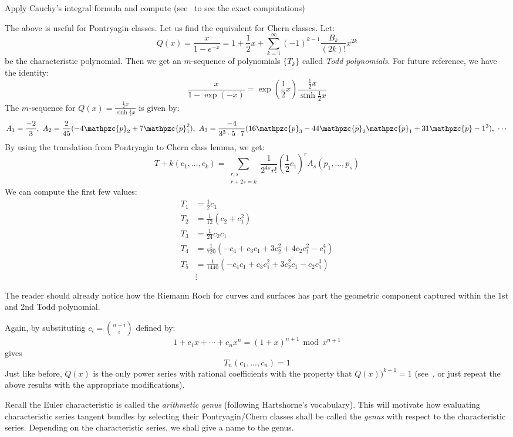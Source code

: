 \documentclass{book}
\newenvironment{Proof}[1][]
  {\begin{ProofTcb}[#1]}
  {\end{ProofTcb}}
\newcommand{\cp}{{\mathpzc{p}}}
\renewcommand{\mod}{\,\operatorname{mod}\,}
\begin{document}
\begin{Proof}
  Apply Cauchy's integral formula and compute (see~\cite[p.12]{hirzebruchTopologicalMethodsAlgebraic1995} to
  see the exact computations)
\end{Proof}

The above is useful for Pontryagin classes. Let us find the equivalent for Chern classes. Let:
\[
  Q(x) = \frac{x}{1-e^{-x}} = 1 + \frac{1}{2}x + \sum_{k=1}^\infty (-1)^{k-1} \frac{B_k}{(2k)!}x^{2k}
\]
be the characteristic polynomial. Then we get an $m$-sequence of polynomials $\{T_k\}$ called \emph{Todd
polynomials}. For future reference, we have the identity:
\[
  \frac{x}{1-\exp(-x)} = \exp \left(\frac{1}{2}x\right) \frac{\frac{1}{2}x}{\sinh \frac{1}{2}x}
\]
The $m$-sequence for $Q(x) = \frac{\frac{1}{2}x}{\sinh \frac{1}{2}x}$ is given by:
\[
  A_1 = \frac{-2}{3},\ A_2 = \frac{2}{45}(-4\cp_2+7\cp_1^2),\  A_3 = \frac{-4}{3^3\cdot 5\cdot 7}(16\cp_3
  -44\cp_2\cp_1 + 31\cp-1^3),\ \cdots
\]
By using the translation from Pontryagin to Chern class lemma, we get:
\[
  T+k(c_1, ..., c_k) = \sum_{\substack{r,s\\r+2s=k}} \frac{1}{2^{4s}r!} \left(\frac{1}{2}c_1\right)^r A_s(p_1, ..., p_s)
\]
We can compute the first few values:
\begin{align*}
  T_1 &= \frac{1}{2}c_1\\
  T_2 &= \frac{1}{12} (c_2 + c_1^2)\\
  T_3 &= \frac{1}{24} c_2c_1\\
  T_4 &= \frac{1}{720} (-c_4 + c_3c_1 + 3c_2^2 + 4c_2c_1^2 - c_1^4)\\
  T_5 &= \frac{1}{1440} \left(-c_4c_1 + c_3c_1^2  +3c_2^2c_1 - c_2c_1^3\right) \\
      &\vdots
\end{align*}

The reader should already notice how the Riemann Roch for curves and surfaces has part the geometric
component captured within the 1st and 2nd Todd polynomial.

Again, by substituting $c_i = \binom{n+i}{i}$ defined by:
\[
  1 + c_1x + \cdots + c_nx^n = (1+x)^{n+1} \mod x^{n+1}
\]
gives
\[
  T_n(c_1, ..., c_n) = 1
\]
Just like before, $Q(x)$ is the only power series with rational coefficients with the property that
$Q(x))^{k+1} = 1$ (see~\cite[p.14]{hirzebruchTopologicalMethodsAlgebraic1995}, or just repeat the above
results with the appropriate modifications).

Recall the Euler characteristic is called the \emph{arithmetic genus} (following Hartshorne's vocabulary).
This will motivate how evaluating characteristic series tangent bundles by selecting their Pontryagin/Chern
classes shall be called the \emph{genus} with respect to the characteristic series. Depending on the
characteristic series, we shall give a name to the genus.
\end{document}
